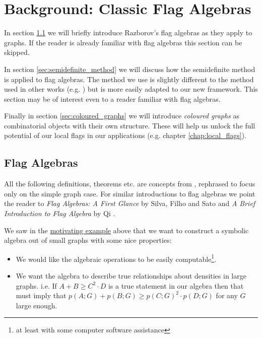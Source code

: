 \chapter{Background: Classic Flag Algebras}
\label{chap:classic_flags}

In section \ref{sec:flag_algebras} we will briefly introduce Razborov's
flag algebras as they apply to
graphs. If the reader is already familiar with flag algebras this section can be skipped.

In section \ref{sec:semidefinite_method} we will discuss how the semidefinite method is applied
to flag algebras.
The method we use is slightly different to the method used in other works
(e.g. \cite{silvaFlagAlgebrasFirst2016}) but is more easily adapted to our new framework. This
section may be of interest even to a reader familiar with flag algebras.

Finally in section \ref{sec:coloured_graphs} we will introduce \textit{coloured graphs} as combinatorial
objects with their own structure. These will help us unlock the full potential of
our local flags in our applications (e.g. chapter \ref{chap:local_flags}).

\section{Flag Algebras}
\label{sec:flag_algebras}

All the following definitions, theorems etc.
are concepts from \cite{razborovFlagAlgebras2007}, rephrased
to focus only on the simple graph case.
For similar introductions to flag algebras we point the reader to
\textit{Flag Algebras: A First Glance} by Silva, Filho and Sato
\cite{silvaFlagAlgebrasFirst2016} and \textit{A Brief Introduction to Flag Algebra} by Qi
\cite{qiBriefIntroductionFlag}.

We saw in the \hyperref[sec:motivating_example]{motivating example} above that we want
to construct a symbolic algebra out of small graphs with some nice properties:
\begin{itemize}
    \item We would like the algebraic operations
        to be easily computable\footnote{at least with some computer software assistance}.
    \item We want the algebra to describe true relationships about densities in large graphs.
        i.e. If $A + B \geq C^2\cdot D$ is a true statement in our algebra
        then that must imply that $p(A; G) + p(B; G) \geq p(C; G)^2 \cdot p(D; G)$ for any $G$ large
        enough.
\end{itemize}

